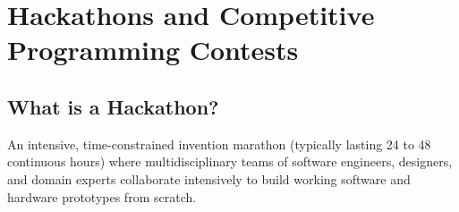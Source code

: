 \section{Hackathons and Competitive Programming Contests}

\subsection{What is a Hackathon?}

\begin{definition}[Hackathon]
An intensive, time-constrained invention marathon (typically lasting 24 to 48 continuous hours) where multidisciplinary teams of software engineers, designers, and domain experts collaborate intensively to build working software and hardware prototypes from scratch.
\end{definition}

